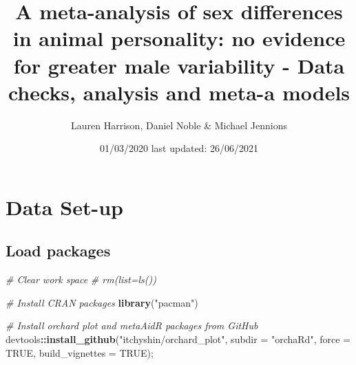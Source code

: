 \documentclass[]{article}
\title{A meta-analysis of sex differences in animal personality: no evidence
for greater male variability - Data checks, analysis and meta-a models}
\author{Lauren Harrison, Daniel Noble \& Michael Jennions}
\date{01/03/2020 last updated: 26/06/2021}
\newenvironment{Shaded}{\begin{snugshade}}{\end{snugshade}}
\newcommand{\KeywordTok}[1]{\textcolor[rgb]{0.13,0.29,0.53}{\textbf{#1}}}
\newcommand{\DataTypeTok}[1]{\textcolor[rgb]{0.13,0.29,0.53}{#1}}
\newcommand{\StringTok}[1]{\textcolor[rgb]{0.31,0.60,0.02}{#1}}
\newcommand{\CommentTok}[1]{\textcolor[rgb]{0.56,0.35,0.01}{\textit{#1}}}
\newcommand{\OtherTok}[1]{\textcolor[rgb]{0.56,0.35,0.01}{#1}}
\newcommand{\OperatorTok}[1]{\textcolor[rgb]{0.81,0.36,0.00}{\textbf{#1}}}
\newcommand{\NormalTok}[1]{#1}
\begin{document}
\maketitle

{
\setcounter{tocdepth}{2}
\tableofcontents
}
\section{Data Set-up}\label{data-set-up}

\subsection{Load packages}\label{load-packages}

\begin{Shaded}
\begin{Highlighting}[]
\CommentTok{# Clear work space}
  \CommentTok{# rm(list=ls())}

\CommentTok{# Install CRAN packages}
  \KeywordTok{library}\NormalTok{(}\StringTok{"pacman"}\NormalTok{)}

\CommentTok{# Install orchard plot and metaAidR packages from GitHub}
\NormalTok{  devtools}\OperatorTok{::}\KeywordTok{install_github}\NormalTok{(}\StringTok{"itchyshin/orchard_plot"}\NormalTok{, }\DataTypeTok{subdir =} \StringTok{"orchaRd"}\NormalTok{, }\DataTypeTok{force =} \OtherTok{TRUE}\NormalTok{, }\DataTypeTok{build_vignettes =} \OtherTok{TRUE}\NormalTok{); }
\end{Highlighting}
\end{Shaded}
\end{document}
